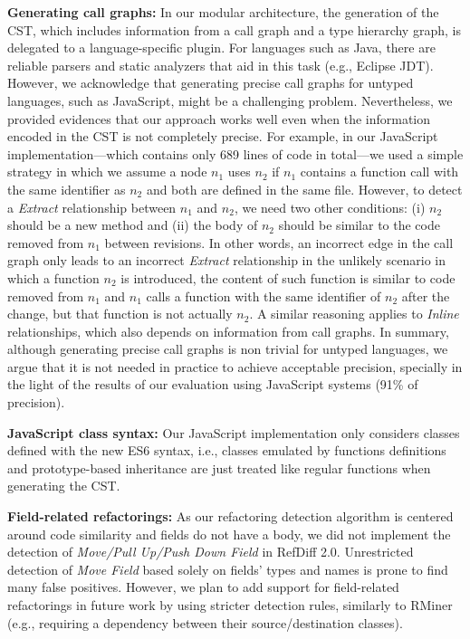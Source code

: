 \noindent\textbf{Generating call graphs:} In our modular architecture, the generation of the CST, which includes information from a call graph and a type hierarchy graph, is delegated to a language-specific plugin.
For languages such as Java, there are reliable parsers and static analyzers that aid in this task (e.g., Eclipse JDT).
However, we acknowledge that generating precise call graphs for untyped languages, such as JavaScript, might be a challenging problem.
Nevertheless, we provided evidences that our approach works well even when the information encoded in the CST is not completely precise.
For example, in our JavaScript implementation---which contains only 689 lines of code in total---we used a simple strategy in which we assume a node $n_1$ uses $n_2$ if $n_1$ contains a function call with the same identifier as $n_2$ and both are defined in the same file.
However, to detect a \emph{Extract} relationship between $n_1$ and $n_2$, we need two other conditions: (i) $n_2$ should be a new method and (ii) the body of $n_2$ should be similar to the code removed from $n_1$ between revisions.
In other words, an incorrect edge in the call graph only leads to an incorrect \emph{Extract} relationship in the unlikely scenario in which a function $n_2$ is introduced, the content of such function is similar to code removed from $n_1$ and $n_1$ calls a function with the same identifier of $n_2$ after the change, but that function is not actually $n_2$.
A similar reasoning applies to \emph{Inline} relationships, which also depends on information from call graphs.
In summary, although generating precise call graphs is non trivial for untyped languages, we argue that it is not needed in practice to achieve acceptable  precision, specially in the light of the results of our evaluation using JavaScript systems (91\% of precision).

\noindent\textbf{JavaScript class syntax:} Our JavaScript implementation only considers classes defined with the new ES6 syntax, i.e., classes emulated by  functions definitions and prototype-based inheritance are just treated like regular functions when generating the CST.

\noindent\textbf{Field-related refactorings:}
As our refactoring detection algorithm is centered around code similarity and fields do not have a body, we did not implement the detection of \emph{Move/Pull Up/Push Down Field} in RefDiff 2.0.
Unrestricted detection of \emph{Move Field} based solely on fields' types and names is prone to find many false positives.
However, we plan to add support for field-related refactorings in future work by using stricter detection rules, similarly to RMiner (e.g., requiring a dependency between their source/destination classes).

